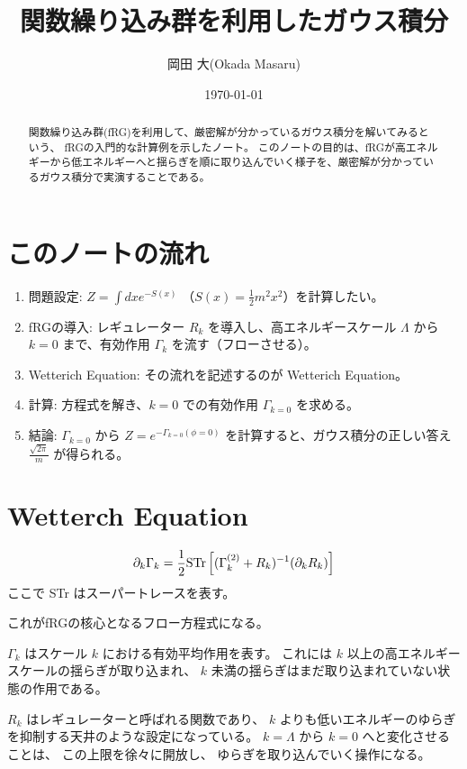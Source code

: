 \documentclass[uplatex,a4j,12pt,dvipdfmx]{jsarticle}
\title{
関数繰り込み群を利用したガウス積分
}
\author{岡田 大(Okada Masaru)}
\date{\today}
\begin{document}
\maketitle

\begin{abstract}
	関数繰り込み群(fRG)を利用して、厳密解が分かっているガウス積分を解いてみるという、
	fRGの入門的な計算例を示したノート。
	このノートの目的は、fRGが高エネルギーから低エネルギーへと揺らぎを順に取り込んでいく様子を、厳密解が分かっているガウス積分で実演することである。
\end{abstract}

\tableofcontents
\section{このノートの流れ}

\begin{enumerate}
	\item 問題設定: $Z = \int dx e^{-S(x)}$ （$S(x) = \frac{1}{2}m^2 x^2$）を計算したい。
	\item fRGの導入: レギュレーター $R_k$ を導入し、高エネルギースケール $\Lambda$ から $k=0$ まで、有効作用 $\Gamma_k$ を流す（フローさせる）。
	\item Wetterich Equation: その流れを記述するのが Wetterich Equation。
	\item 計算: 方程式を解き、$k=0$ での有効作用 $\Gamma_{k=0}$ を求める。
	\item 結論: $\Gamma_{k=0}$ から $Z = e^{-\Gamma_{k=0}(\phi=0)}$ を計算すると、ガウス積分の正しい答え $\frac{\sqrt{2\pi}}{m}$ が得られる。
\end{enumerate}

\section{Wetterch Equation}

\[
	\partial_{k} \Gamma_{k}
	=
	\frac{1}{2} {\rm STr} \left[ (\Gamma^{(2)}_{k} + R_{k})^{-1} (\partial_{k} R_{k}) \right]
\]
ここで STr はスーパートレースを表す。

これがfRGの核心となるフロー方程式になる。

$\Gamma_{k}$ はスケール $k$ における有効平均作用を表す。
これには $k$ 以上の高エネルギースケールの揺らぎが取り込まれ、
$k$ 未満の揺らぎはまだ取り込まれていない状態の作用である。

$R_{k}$ はレギュレーターと呼ばれる関数であり、
$k$ よりも低いエネルギーのゆらぎを抑制する天井のような設定になっている。
$k = \Lambda$ から $k=0$ へと変化させることは、
この上限を徐々に開放し、
ゆらぎを取り込んでいく操作になる。
\end{document}
